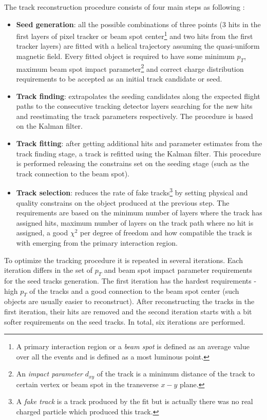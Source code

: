The track reconstruction procedure consists of four main steps as following \cite{Chatrchyan:2014fea}:

\begin{itemize}
 \item \textbf{Seed generation}: all the possible combinations of three points (3 hits in the first layers of pixel tracker or beam spot center\footnote
 {A primary interaction region or a \textit{beam spot} is defined as an average value over all the events and is defined as a most luminous point.} and
 two hits from the first tracker layers) are fitted with a helical trajectory assuming the quasi-uniform magnetic field. Every fitted object is required
 to have some minimum $p_{T}$, maximum beam spot impact parameter\footnote{An \textit{impact parameter} $d_{xy}$ of the track is a minimum
 distance of the track to certain vertex or beam spot in the transverse $x-y$ plane.} and correct charge distribution requirements to be accepted
 as an initial track candidate or seed.
 \item \textbf{Track finding}: extrapolates the seeding candidates along the expected flight paths to the consecutive tracking detector layers searching 
 for the new hits and reestimating the track parameters respectively. The procedure is based on the Kalman filter\cite{Fruhwirth:1987fm}.
 \item \textbf{Track fitting}: after getting additional hits and parameter estimates from the track finding stage, a track is refitted using the 
 Kalman filter. This procedure is performed releasing the constrains set on the seeding stage (such as the track connection to the beam spot).
 \item \textbf{Track selection}: reduces the rate of fake tracks\footnote{A \textit{fake track} is a track produced by the fit but is actually there was
 no real charged particle which produced this track.} by setting physical and quality constrains on the object produced at the previous step. The requirements
 are based on the minimum number of layers where the track has assigned hits, maximum number of layers on the track path where no hit is assigned,
 a good $\chi^{2}$ per degree of freedom and how compatible the track is with emerging from the primary interaction region.
\end{itemize}

To optimize the tracking procedure it is repeated in several iterations. Each iteration differs in the set of $p_{T}$ and beam spot impact parameter
requirements for the seed tracks generation\cite{Chatrchyan:2014fea}. The first iteration has the hardest requirements - high $p_{T}$ of the tracks
and a good connection to the beam spot center (such objects are usually easier to reconstruct). After reconstructing the tracks in the first iteration,
their hits are removed and the second iteration starts with a bit softer requirements on the seed tracks. In total, six iterations are performed.

